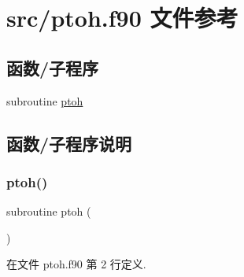 \hypertarget{ptoh_8f90}{}\section{src/ptoh.f90 文件参考}
\label{ptoh_8f90}
\subsection*{函数/子程序}
\begin{DoxyCompactItemize}
\item 
subroutine \mbox{\hyperlink{ptoh_8f90_a3875378e6075d8676bc8df9e42b22386}{ptoh}}
\end{DoxyCompactItemize}


\subsection{函数/子程序说明}
\mbox{\label{ptoh_8f90_a3875378e6075d8676bc8df9e42b22386}} 
\subsubsection{\texorpdfstring{ptoh()}{ptoh()}}
{\footnotesize\ttfamily subroutine ptoh (\begin{DoxyParamCaption}{ }\end{DoxyParamCaption})}



在文件 ptoh.\+f90 第 2 行定义.

